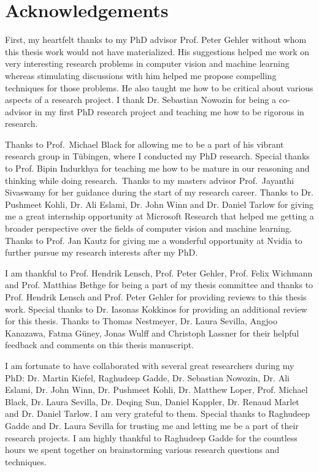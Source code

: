 \chapter{Acknowledgements}
\label{chap:ack}

First, my heartfelt thanks to my PhD advisor Prof. Peter Gehler without whom
this thesis work would not have materialized. His suggestions helped me work
on very interesting research problems in computer vision and machine learning
whereas stimulating discussions with him helped me propose compelling techniques
for those problems. He also taught me how to be critical about various aspects of
a research project. I thank Dr. Sebastian Nowozin for being a co-advisor in my
first PhD research project and teaching me how to be rigorous in research.

Thanks to Prof.~Michael Black for allowing me to be a part of his vibrant research
group in T\"ubingen, where I conducted my PhD research. Special thanks to
Prof. Bipin Indurkhya for teaching me how to be mature in our reasoning and thinking
while doing research.~Thanks to my masters advisor Prof.~Jayanthi Sivaswamy for her
guidance during the start of my research career. Thanks to Dr. Pushmeet Kohli,
Dr. Ali Eslami, Dr. John Winn and Dr. Daniel Tarlow for giving me a great internship
opportunity at Microsoft Research that helped me getting a broader perspective over
the fields of computer vision and machine learning.
Thanks to Prof. Jan Kautz for giving me a wonderful opportunity at Nvidia
to further pursue my research interests after my PhD.

I am thankful to Prof. Hendrik Lensch, Prof. Peter Gehler, Prof. Felix Wichmann and
Prof. Matthias Bethge for being a part of my thesis committee and
thanks to Prof. Hendrik Lensch and Prof. Peter Gehler for providing reviews to
this thesis work. Special thanks to Dr. Iasonas Kokkinos for providing an additional
review for this thesis.
Thanks to Thomas Nestmeyer, Dr. Laura Sevilla, Angjoo Kanazawa,
Fatma G\"uney, Jonas Wulff and Christoph Lassner for their helpful feedback
and comments on this thesis manuscript.

I am fortunate to have collaborated with several great researchers during my
PhD: Dr. Martin Kiefel, Raghudeep Gadde, Dr. Sebastian Nowozin, Dr. Ali Eslami,
Dr. John Winn, Dr. Pushmeet Kohli, Dr. Matthew Loper, Prof. Michael Black,
Dr. Laura Sevilla, Dr. Deqing Sun, Daniel Kappler, Dr. Renaud Marlet and Dr. Daniel Tarlow.
I am very grateful to them.
Special thanks to Raghudeep Gadde and Dr. Laura Sevilla for trusting me and
letting me be a part of their research projects. I am highly thankful to Raghudeep Gadde
for the countless hours we spent together on brainstorming various research questions
and techniques.

